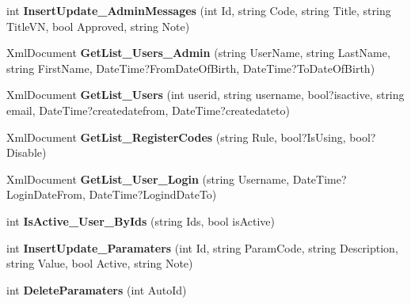 \begin{DoxyCompactItemize}
\item 
\hypertarget{class_data_service_ac39fba49f63220713b78347998ff0890}{int {\bfseries Insert\-Update\-\_\-\-Admin\-Messages} (int Id, string Code, string Title, string Title\-V\-N, bool Approved, string Note)}\label{class_data_service_ac39fba49f63220713b78347998ff0890}

\item 
\hypertarget{class_data_service_a480553163cb3871f5d7b4650340e43bc}{Xml\-Document {\bfseries Get\-List\-\_\-\-Users\-\_\-\-Admin} (string User\-Name, string Last\-Name, string First\-Name, Date\-Time?From\-Date\-Of\-Birth, Date\-Time?To\-Date\-Of\-Birth)}\label{class_data_service_a480553163cb3871f5d7b4650340e43bc}

\item 
\hypertarget{class_data_service_ade287c6ebd7e84412ef3b6febe950369}{Xml\-Document {\bfseries Get\-List\-\_\-\-Users} (int userid, string username, bool?isactive, string email, Date\-Time?createdatefrom, Date\-Time?createdateto)}\label{class_data_service_ade287c6ebd7e84412ef3b6febe950369}

\item 
\hypertarget{class_data_service_a558deda59beb25d6023f672e48998960}{Xml\-Document {\bfseries Get\-List\-\_\-\-Register\-Codes} (string Rule, bool?Is\-Using, bool?Disable)}\label{class_data_service_a558deda59beb25d6023f672e48998960}

\item 
\hypertarget{class_data_service_ad16c9689171fb8c28740feee6829113d}{Xml\-Document {\bfseries Get\-List\-\_\-\-User\-\_\-\-Login} (string Username, Date\-Time?Login\-Date\-From, Date\-Time?Logind\-Date\-To)}\label{class_data_service_ad16c9689171fb8c28740feee6829113d}

\item 
\hypertarget{class_data_service_a29d0e6c75cf2e4d4066370613bc33e0d}{int {\bfseries Is\-Active\-\_\-\-User\-\_\-\-By\-Ids} (string Ids, bool is\-Active)}\label{class_data_service_a29d0e6c75cf2e4d4066370613bc33e0d}

\item 
\hypertarget{class_data_service_a45307371dd403c43dcc30466a78955a3}{int {\bfseries Insert\-Update\-\_\-\-Paramaters} (int Id, string Param\-Code, string Description, string Value, bool Active, string Note)}\label{class_data_service_a45307371dd403c43dcc30466a78955a3}

\item 
\hypertarget{class_data_service_a107244431463e7db7c8d8935dca02990}{int {\bfseries Delete\-Paramaters} (int Auto\-Id)}\label{class_data_service_a107244431463e7db7c8d8935dca02990}


\end{DoxyCompactItemize}
